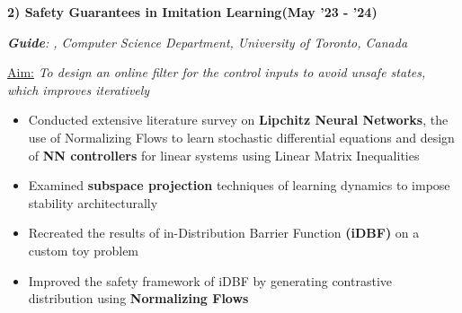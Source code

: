 \documentclass[10pt,letterpaper,sans]{moderncv}        %
\newcommand\x{1}
\newcommand\y{4}
\begin{document}
\begin{itemize}



\end{itemize}


\hrulefill{}
\vspace{\y pt}

\textbf{2) Safety Guarantees in Imitation Learning}\hfill{\textbf{(May '23 - '24)}}

\textit{\textbf{Guide}: , Computer Science Department, University of Toronto, Canada} 

\vspace{\x pt}

\textcolor{mygray}{
\underline{Aim:}
\textit{To %
design an online filter for the control inputs to avoid unsafe states, which improves iteratively}
}\vspace{\x pt}
\begin{itemize}
    \item Conducted extensive literature survey on \textbf{Lipchitz Neural Networks}, the use of Normalizing Flows to learn stochastic differential equations and design of \textbf{NN controllers} for linear systems using Linear Matrix Inequalities
    \item Examined \textbf{subspace projection} techniques of learning dynamics to impose stability architecturally
    \item Recreated the results of in-Distribution Barrier Function \textbf{(iDBF)} on a custom toy problem
    \item Improved the safety framework of iDBF by generating contrastive distribution using \textbf{Normalizing Flows} 
\end{itemize}
\end{document}

